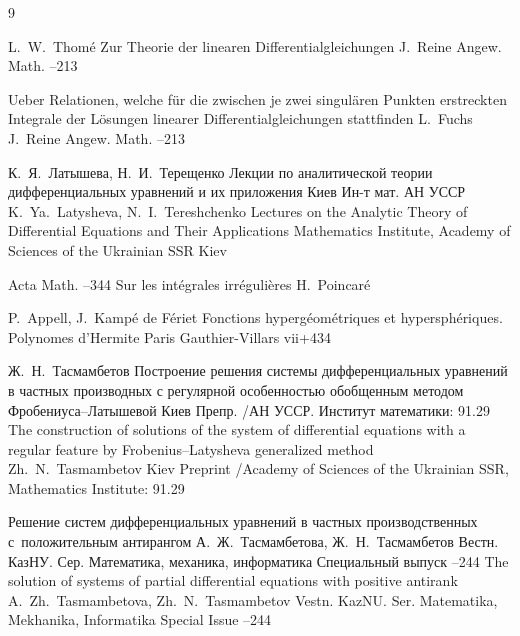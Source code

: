 
\begin{thebibliography}{9}

\by L.~W.~Thom\'e
\paper Zur Theorie der linearen Differentialgleichungen
\jour  	J.~Reine Angew. Math.
--213


\paper Ueber Relationen, welche f\"ur die zwischen je zwei singul\"aren Punkten erstreckten Integrale der L\"osungen linearer Differentialgleichungen stattfinden
\by L.~Fuchs
\jour  	J.~Reine Angew. Math.
--213


\by К.~Я.~Латышева, Н.~И.~Терещенко
\book Лекции по аналитической теории дифференциальных уравнений и их приложения
\publaddr Киев
\publ Ин-т мат. АН УССР
\misctransl 
\by K.~Ya.~Latysheva, N.~I.~Tereshchenko
\book Lectures on the Analytic Theory of Differential Equations and Their Applications 
\publ  Mathematics Institute, Academy of Sciences of the Ukrainian SSR
\publaddr Kiev 


\jour Acta Math.
--344
\paper Sur les int\'egrales irr\'eguli\`eres
\by H.~Poincar\'e

\by P.~Appell, J.~Kamp\'e de F\'eriet
\book Fonctions hyperg\'eom\'etriques et hypersph\'eriques. Polynomes d'Hermite
\publaddr Paris
\publ Gauthier-Villars 
\totalpages vii+434



\by Ж.~Н.~Тасмамбетов
\preprint Построение решения системы дифференциальных уравнений в частных производных с регулярной особенностью обобщенным методом Фробениуса--Латышевой
\publaddr Киев
\preprintinfo Препр. /АН УССР. Институт математики: 91.29
\misctransl
\preprint The construction of solutions of the system of differential equations  with a regular feature by Frobenius--Latysheva generalized method 
\by Zh.~N.~Tasmambetov
\publaddr Kiev
\preprintinfo Preprint /Academy of Sciences of the Ukrainian SSR, Mathematics Institute: 91.29




\paper Решение систем дифференциальных уравнений в частных производственных с~положительным антирангом
\by А.~Ж.~Тасмамбетова, Ж.~Н.~Тасмамбетов
\jour Вестн. КазНУ. Сер. Математика, механика, информатика
\issueinfo Специальный выпуск
--244
\misctransl
\paper The solution of systems of partial differential equations with positive antirank
\by A.~Zh.~Tasmambetova, Zh.~N.~Tasmambetov 
\jour Vestn. KazNU. Ser. Matematika, Mekhanika, Informatika 
\issueinfo Special Issue 
--244





\end{thebibliography}

